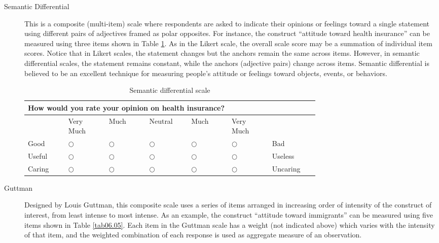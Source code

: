\begin{description}
	\item[Semantic Differential] This is a composite (multi-item) scale where respondents are asked to indicate their opinions or feelings toward a single statement using different pairs of adjectives framed as polar opposites. For instance, the construct ``attitude toward health insurance'' can be measured using three items shown in Table \ref{tab06.04}. As in the Likert scale, the overall scale score may be a summation of individual item scores. Notice that in Likert scales, the statement changes but the anchors remain the same across items. However, in semantic differential scales, the statement remains constant, while the anchors (adjective pairs) change across items. Semantic differential is believed to be an excellent technique for measuring people's attitude or feelings toward objects, events, or behaviors. 
	
	
	\begin{table}[H]
		\centering
		\begin{tabularx}{0.95\linewidth}{p{0.10\linewidth}p{0.10\linewidth}p{0.10\linewidth}p{0.10\linewidth}p{0.10\linewidth}p{0.10\linewidth}p{0.10\linewidth}}
			\toprule
			\multicolumn{7}{p{0.95\linewidth}}{How would you rate your opinion on health insurance?} \\	
			\midrule
			{} & {\footnotesize Very Much} & {\footnotesize Much} & {\footnotesize Neutral} & {\footnotesize Much} & {\footnotesize Very Much} & {} \\
			\midrule
			{\footnotesize Good} & $ \bigcirc $ & $ \bigcirc $ & $ \bigcirc $ & $ \bigcirc $ & $ \bigcirc $ & {\footnotesize Bad} \\
			{\footnotesize Useful} & $ \bigcirc $ & $ \bigcirc $ & $ \bigcirc $ & $ \bigcirc $ & $ \bigcirc $ & {\footnotesize Useless} \\
			{\footnotesize Caring} & $ \bigcirc $ & $ \bigcirc $ & $ \bigcirc $ & $ \bigcirc $ & $ \bigcirc $ & {\footnotesize Uncaring} \\
			\bottomrule
		\end{tabularx}
		\caption{Semantic differential scale}
		\label{tab06.04}
	\end{table}
	
	\item[Guttman] Designed by Louis Guttman, this composite scale uses a series of items arranged in increasing order of intensity of the construct of interest, from least intense to most intense. As an example, the construct ``attitude toward immigrants'' can be measured using five items shown in Table \ref{tab06.05}. Each item in the Guttman scale has a weight (not indicated above) which varies with the intensity of that item, and the weighted combination of each response is used as aggregate measure of an observation.
	

\end{description}
